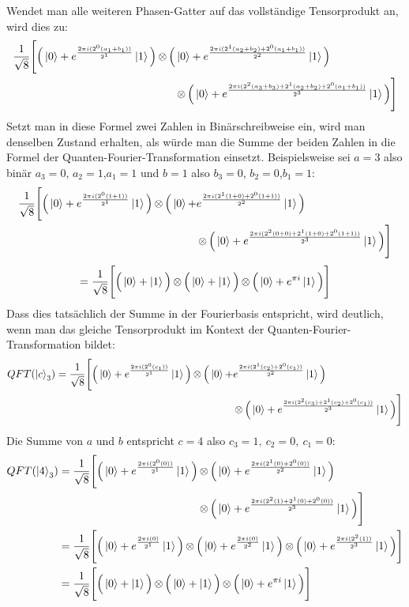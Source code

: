 Wendet man alle weiteren Phasen-Gatter auf das vollständige Tensorprodukt an, 
wird dies zu:
\begin{align*}
    \frac{1}{\sqrt{8}} 
    \Bigg[ 
      \Big(\ket{0} + { e^{\frac{2 \pi i (2^0(a_1+b_1))}{2^1}}}\ket{1} \Big) 
      \operatorname{\otimes}
      \Big( &\ket{0} + { e^{\frac{2 \pi i (2^1(a_2+b_2)+2^0(a_1+b_1))}{2^2}}}\ket{1} \Big)\\ 
      &\operatorname{\otimes}
      \Big( \ket{0} + { e^{\frac{2 \pi i (2^{2}(a_3+b_3) +2^1(a_2+b_2)+2^0(a_1+b_1))}{2^3}}}\ket{1} \Big) 
    \Bigg]
\end{align*}
Setzt man in diese Formel zwei Zahlen in Binärschreibweise ein, 
wird man denselben Zustand erhalten,
als würde man die Summe der beiden Zahlen in die Formel der Quanten-Fourier-Transformation einsetzt.
Beispielsweise sei \(a = 3\) also binär \(a_3 = 0\), \(a_2 = 1\),\(a_1 = 1\) und 
\(b = 1\) also \(b_3 = 0\), \(b_2 = 0\),\(b_1 = 1\):
\begin{align*}
\frac{1}{\sqrt{8}} 
\Bigg[ \Big(\ket{0} + { e^{\frac{2 \pi i (2^0(1+1))}{2^1}}}\ket{1} \Big) 
\operatorname{\otimes}
\Big( \ket{0} + &{ e^{\frac{2 \pi i (2^1(1+0)+2^0(1+1))}{2^2}}}\ket{1} \Big) \\
&\operatorname{\otimes}
\Big( \ket{0} + { e^{\frac{2 \pi i (2^{2}(0+0) +2^1(1+0)+2^0(1+1))}{2^3}}}\ket{1} \Big) 
\Bigg]
\end{align*}
\[
=\frac{1}{\sqrt{8}} 
\Bigg[ \Big(\ket{0} + \ket{1} \Big) \operatorname{\otimes}
\Big( \ket{0} +   \ket{1} \Big) \operatorname{\otimes}
\Big( \ket{0} +  e^{\pi i }\ket{1} \Big) 
\Bigg]
\]
Dass dies tatsächlich der Summe in der Fourierbasis entspricht, wird deutlich, 
wenn man das gleiche Tensorprodukt im Kontext der Quanten-Fourier-Transformation bildet:
\begin{align*}
    QFT(\ket{c}_3) = 
    \frac{1}{\sqrt{8}} 
    \Bigg[ \Big(\ket{0} + { e^{\frac{2 \pi i (2^0(c_1))}{2^1}}}\ket{1} \Big) 
    \operatorname{\otimes}
    \Big( \ket{0} + &{ e^{\frac{2 \pi i (2^1(c_2)+2^0(c_1))}{2^2}}}\ket{1} \Big) \\
    &\operatorname{\otimes}
    \Big( \ket{0} + { e^{\frac{2 \pi i (2^{2}(c_3) +2^1(c_2)+2^0(c_1))}{2^3}}}\ket{1} \Big) 
\Bigg]
\end{align*}
Die Summe von \(a\) und \(b\) entspricht \(c = 4\) also \(c_3 = 1,~c_2 = 0,~c_1=0\):
\begin{align*}
    QFT(\ket{4}_3) &=
    \begin{aligned}[t]
      \frac{1}{\sqrt{8}} \Bigg[ \Big(\ket{0} + { e^{\frac{2 \pi i (2^0(0))}{2^1}}}\ket{1} \Big) 
      &\operatorname{\otimes}
      \Big( \ket{0} + { e^{\frac{2 \pi i (2^1(0)+2^0(0))}{2^2}}}\ket{1} \Big) \\
      &\operatorname{\otimes}
      \Big( \ket{0} + { e^{\frac{2 \pi i (2^{2}(1) +2^1(0)+2^0(0))}{2^3}}}\ket{1} \Big) \Bigg]
    \end{aligned} \\
    &= 
    \frac{1}{\sqrt{8}} \Bigg[ \Big(\ket{0} + { e^{\frac{2 \pi i (0)}{2^1}}}\ket{1} \Big) 
    \operatorname{\otimes}
    \Big( \ket{0} + { e^{\frac{2 \pi i (0)}{2^2}}}\ket{1} \Big) 
    \operatorname{\otimes}
    \Big( \ket{0} + { e^{\frac{2 \pi i (2^{2}(1))}{2^3}}}\ket{1} \Big) \Bigg] \\
    &=\frac{1}{\sqrt{8}} \Bigg[ \Big(\ket{0} + \ket{1} \Big) 
    \operatorname{\otimes}
    \Big( \ket{0} +   \ket{1} \Big) 
    \operatorname{\otimes}
    \Big( \ket{0} +  e^{\pi i }\ket{1} \Big) \Bigg]
\end{align*}
